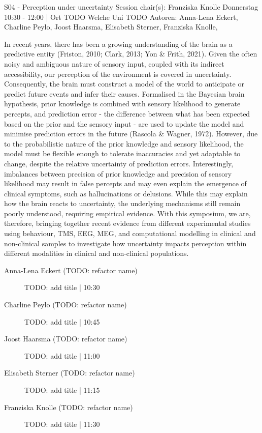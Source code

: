 
            \begin{symposium}
            {S04 - Perception under uncertainty}
            {Session chair(s):  Franziska Knolle}
            {Donnerstag 10:30 - 12:00 | Ort TODO}
            {Welche Uni TODO}
            Autoren: Anna-Lena Eckert, Charline Peylo, Joost Haarsma, Elisabeth Sterner, Franziska Knolle, 

In recent years, there has been a growing understanding of the brain as a predictive entity (Friston, 2010; Clark, 2013; Yon \& Frith, 2021). Given the often noisy and ambiguous nature of sensory input, coupled with its indirect accessibility, our perception of the environment is covered in uncertainty. Consequently, the brain must construct a model of the world to anticipate or predict future events and infer their causes. Formalised in the Bayesian brain hypothesis, prior knowledge is combined with sensory likelihood to generate percepts, and prediction error - the difference between what has been expected based on the prior and the sensory input - are used to update the model and minimise prediction errors in the future (Rascola \& Wagner, 1972). However, due to the probabilistic nature of the prior knowledge and sensory likelihood, the model must be flexible enough to tolerate inaccuracies and yet adaptable to change, despite the relative uncertainty of prediction errors. Interestingly, imbalances between precision of prior knowledge and precision of sensory likelihood may result in false percepts and may even explain the emergence of clinical symptoms, such as hallucinations or delusions. While this may explain how the brain reacts to uncertainty, the underlying mechanisms still remain poorly understood, requiring empirical evidence.
With this symposium, we are, therefore, bringing together recent evidence from different experimental studies using behaviour, TMS, EEG, MEG, and computational modelling in clinical and non-clinical samples to investigate how uncertainty impacts perception within different modalities in clinical and non-clinical populations.
            \begin{description}    
            
                \item [Anna-Lena Eckert (TODO: refactor name)] TODO: add title \textcolor{mygray}{ | 10:30}    
                
                \item [Charline Peylo (TODO: refactor name)] TODO: add title \textcolor{mygray}{ | 10:45}    
                
                \item [Joost Haarsma (TODO: refactor name)] TODO: add title \textcolor{mygray}{ | 11:00}    
                
                \item [Elisabeth Sterner (TODO: refactor name)] TODO: add title \textcolor{mygray}{ | 11:15}    
                
                \item [Franziska Knolle (TODO: refactor name)] TODO: add title \textcolor{mygray}{ | 11:30}    
                
            \end{description} 
            \end{symposium}
            